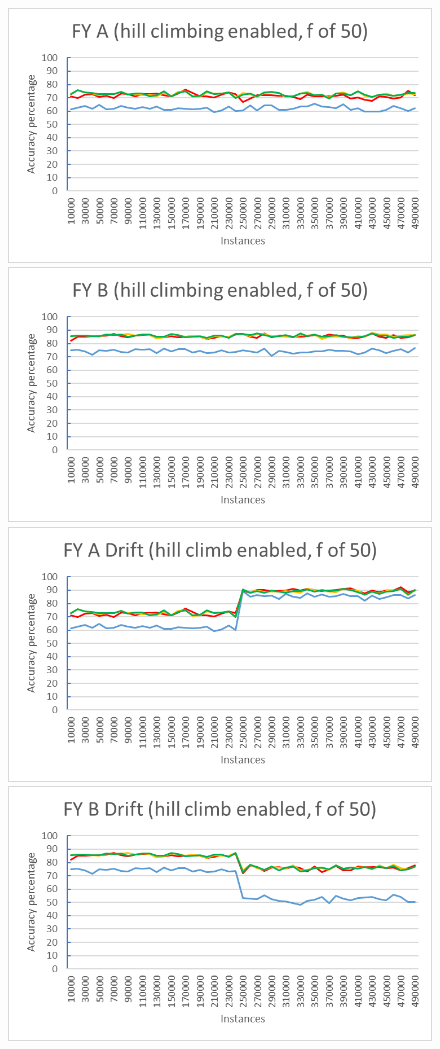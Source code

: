 \begin{figure}[h]
\begin{center}
\includegraphics[scale=0.25]{Graphs/FY_A/H_graph}
\includegraphics[scale=0.25]{Graphs/FY_B/H_graph}
\includegraphics[scale=0.25]{Graphs/FY_A_Drift/H_graph}
\includegraphics[scale=0.25]{Graphs/FY_B_Drift/H_graph}

\end{center}
\end{figure}
